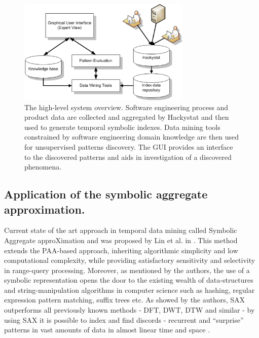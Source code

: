 \documentclass{sig-alternate}
\begin{document}
\begin{figure}[tpb]
   \centering
   \includegraphics[height=50mm]{system_overview.eps}
   \caption{The high-level system overview. Software engineering process and product data are collected and aggregated by Hackystat and then used to generate temporal symbolic indexes. Data mining tools constrained by software engineering domain knowledge are then used for unsupervised patterns discovery. The GUI provides an interface to the discovered patterns and aids in investigation of a discovered phenomena.}
   \label{fig:system_overview}
\end{figure}

\subsection{Application of the symbolic aggregate approximation.}
Current state of the art approach in temporal data mining called Symbolic Aggregate approXimation and was proposed by Lin et al. in \cite{citeulike:2821475}. This method extends the PAA-based approach, inheriting algorithmic simplicity and low computational complexity, while providing satisfactory sensitivity and selectivity in range-query processing. Moreover, as mentioned by the authors, the use of a symbolic representation opens the door to the existing wealth of data-structures and string-manipulation algorithms in computer science such as hashing, regular expression pattern matching, suffix trees etc. As showed by the authors, SAX outperforms all previously known methods - DFT, DWT, DTW and similar - by using SAX it is possible to index and find discords - recurrent and ``surprise'' patterns in vast amounts of data in almost linear time and space \cite{citeulike:1630245} \cite{citeulike:3025877} \cite{citeulike:3000416}. 
\end{document}
